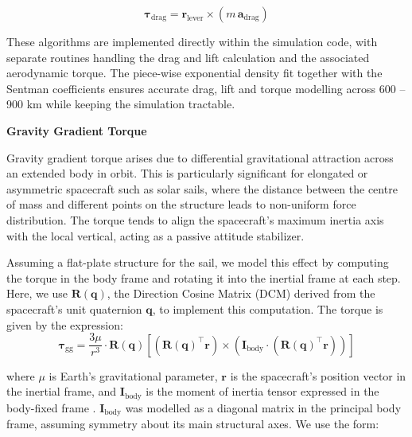\documentclass[final,3p,times,twocolumn]{elsarticle}
\begin{document}
\begin{equation}
\boldsymbol{\tau}_{\mathrm{drag}} = \mathbf{r}_{\text{lever}} \times \left( m\,\mathbf{a}_{\mathrm{drag}} \right)
\label{eq:drag_torque}
\end{equation}

\par\noindent These algorithms are implemented directly within the simulation code, with separate routines handling the drag and lift calculation and the associated aerodynamic torque. The piece-wise exponential density fit together with the Sentman coefficients ensures accurate drag, lift and torque modelling across 600 – 900 km while keeping the simulation tractable. \vspace{7pt}

\noindent\textbf{Gravity Gradient Torque}\vspace{2pt}
\par\noindent Gravity gradient torque arises due to differential gravitational attraction across an extended body in orbit. This is particularly significant for elongated or asymmetric spacecraft such as solar sails, where the distance between the centre of mass and different points on the structure leads to non-uniform force distribution. The torque tends to align the spacecraft’s maximum inertia axis with the local vertical, acting as a passive attitude stabilizer.
\vspace{5pt}
\par\noindent Assuming a flat-plate structure for the sail, we model this effect by computing the torque in the body frame and rotating it into the inertial frame at each step. Here, we use \( \mathbf{R}(\mathbf{q}) \), the Direction Cosine Matrix (DCM) derived from the spacecraft's unit quaternion \( \mathbf{q} \), to implement this computation. The torque is given by the expression:
\begin{equation}
\boldsymbol{\tau}_{\text{gg}} = \frac{3\mu}{r^3} \cdot \mathbf{R}(\mathbf{q}) \left[ \left( \mathbf{R}(\mathbf{q})^\top \mathbf{r} \right) \times \left( \mathbf{I}_{\text{body}} \cdot \left( \mathbf{R}(\mathbf{q})^\top \mathbf{r} \right) \right) \right]
\end{equation}

\noindent where \(\mu\) is Earth's gravitational parameter, \(\mathbf{r}\) is the spacecraft's position vector in the inertial frame, and \(\mathbf{I}_{\text{body}}\) is the moment of inertia tensor expressed in the body-fixed frame \citep{grav_grad}. $\mathbf{I}_{\text{body}}$ was modelled as a diagonal matrix in the principal body frame, assuming symmetry about its main structural axes. We use the form:
\end{document}
